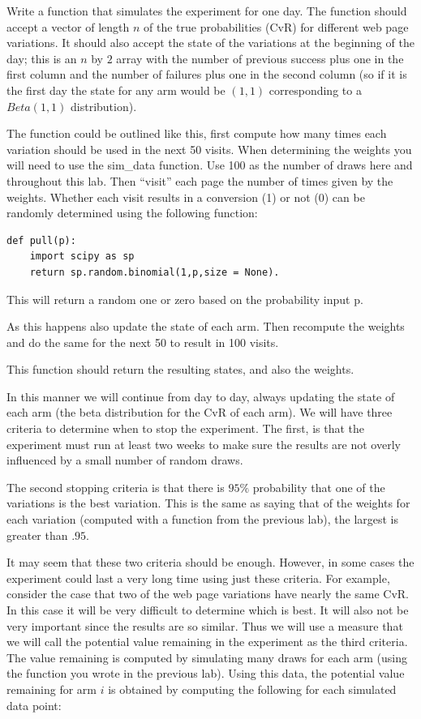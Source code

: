 \begin{problem}
Write a function that simulates the experiment for one day.  The function should accept a vector of length $n$ of the true probabilities (CvR) for different web page variations.  It should also accept the state of the variations at the beginning of the day; this is an $n$ by $2$ array with the number of previous success plus one in the first column and the number of failures plus one in the second column (so if it is the first day the state for any arm would be $(1,1)$ corresponding to a $Beta(1,1)$ distribution).

The function could be outlined like this, first compute how many times each variation should be used in the next 50 visits.  When determining the weights you will need to use the sim\_data function.  Use 100 as the number of draws here and throughout this lab.  Then ``visit'' each page the number of times given by the weights.  Whether each visit results in a conversion (1) or not (0) can be randomly determined using the following function:

\begin{lstlisting}[style = python]
def pull(p):
    import scipy as sp
    return sp.random.binomial(1,p,size = None).
\end{lstlisting}
This will return a random one or zero based on the probability input p.

As this happens also update the state of each arm.  Then recompute the weights and do the same for the next 50 to result in 100 visits.  

This function should return the resulting states, and also the weights.
\end{problem}

In this manner we will continue from day to day, always updating the state of each arm (the beta distribution for the CvR of each arm).  We will have three criteria to determine when to stop the experiment.  The first, is that the experiment must run at least two weeks to make sure the results are not overly influenced by a small number of random draws.

The second stopping criteria is that there is $95\%$ probability that one of the variations is the best variation.  This is the same as saying that of the weights for each variation (computed with a function from the previous lab), the largest is greater than $.95$.

It may seem that these two criteria should be enough.  However, in some cases the experiment could last a very long time using just these criteria.  For example, consider the case that two of the web page variations have nearly the same CvR.  In this case it will be very difficult to determine which is best.  It will also not be very important since the results are so similar.  Thus we will use a measure that we will call the potential value remaining in the experiment as the third criteria.  The value remaining is computed by simulating many draws for each arm (using the function you wrote in the previous lab).  Using this data, the potential value remaining for arm $i$ is obtained by computing the following for each simulated data point:

